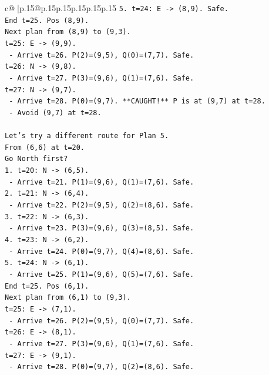 \documentclass{article}
\begin{document}
{\begin{supertabular}{c@{$\;$}|p{.15\linewidth}@{}p{.15\linewidth}p{.15\linewidth}p{.15\linewidth}p{.15\linewidth}p{.15\linewidth}}
{{{\texttt{5. t=24: E {-}> (8,9). Safe.} \\
\texttt{End t=25. Pos (8,9).} \\
\texttt{Next plan from (8,9) to (9,3).} \\
\texttt{t=25: E {-}> (9,9).} \\
\texttt{   {-} Arrive t=26. P(2)=(9,5), Q(0)=(7,7). Safe.} \\
\texttt{t=26: N {-}> (9,8).} \\
\texttt{   {-} Arrive t=27. P(3)=(9,6), Q(1)=(7,6). Safe.} \\
\texttt{t=27: N {-}> (9,7).} \\
\texttt{   {-} Arrive t=28. P(0)=(9,7). **CAUGHT!** P is at (9,7) at t=28.} \\
\texttt{   {-} Avoid (9,7) at t=28.} \\
\\ 
\texttt{Let's try a different route for Plan 5.} \\
\texttt{From (6,6) at t=20.} \\
\texttt{Go North first?} \\
\texttt{1. t=20: N {-}> (6,5).} \\
\texttt{   {-} Arrive t=21. P(1)=(9,6), Q(1)=(7,6). Safe.} \\
\texttt{2. t=21: N {-}> (6,4).} \\
\texttt{   {-} Arrive t=22. P(2)=(9,5), Q(2)=(8,6). Safe.} \\
\texttt{3. t=22: N {-}> (6,3).} \\
\texttt{   {-} Arrive t=23. P(3)=(9,6), Q(3)=(8,5). Safe.} \\
\texttt{4. t=23: N {-}> (6,2).} \\
\texttt{   {-} Arrive t=24. P(0)=(9,7), Q(4)=(8,6). Safe.} \\
\texttt{5. t=24: N {-}> (6,1).} \\
\texttt{   {-} Arrive t=25. P(1)=(9,6), Q(5)=(7,6). Safe.} \\
\texttt{End t=25. Pos (6,1).} \\
\texttt{Next plan from (6,1) to (9,3).} \\
\texttt{t=25: E {-}> (7,1).} \\
\texttt{   {-} Arrive t=26. P(2)=(9,5), Q(0)=(7,7). Safe.} \\
\texttt{t=26: E {-}> (8,1).} \\
\texttt{   {-} Arrive t=27. P(3)=(9,6), Q(1)=(7,6). Safe.} \\
\texttt{t=27: E {-}> (9,1).} \\
\texttt{   {-} Arrive t=28. P(0)=(9,7), Q(2)=(8,6). Safe.} \\
}}}
\end{supertabular}}
\end{document}
